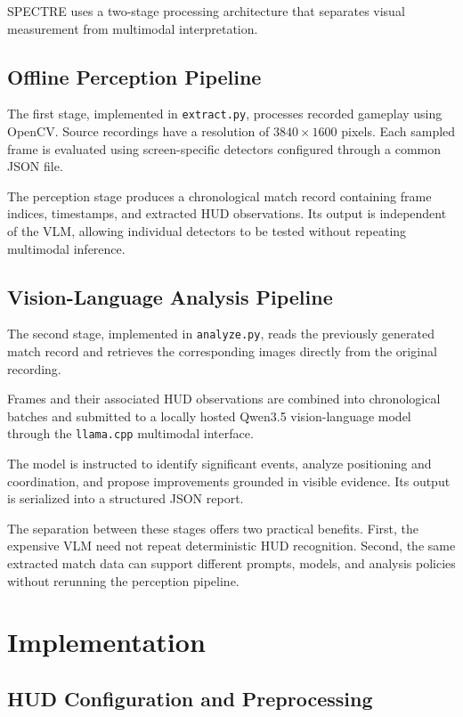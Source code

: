 \documentclass[10pt,letterpaper]{article}
\begin{document}
SPECTRE uses a two-stage processing architecture that separates
visual measurement from multimodal interpretation.

\subsection{Offline Perception Pipeline}

The first stage, implemented in \texttt{extract.py}, processes
recorded gameplay using OpenCV. Source recordings have a resolution
of $3840 \times 1600$ pixels. Each sampled frame is evaluated using
screen-specific detectors configured through a common JSON file.

The perception stage produces a chronological match record
containing frame indices, timestamps, and extracted HUD observations.
Its output is independent of the VLM, allowing individual detectors
to be tested without repeating multimodal inference.

\subsection{Vision-Language Analysis Pipeline}

The second stage, implemented in \texttt{analyze.py}, reads the
previously generated match record and retrieves the corresponding
images directly from the original recording.

Frames and their associated HUD observations are combined into
chronological batches and submitted to a locally hosted Qwen3.5
vision-language model through the \texttt{llama.cpp} multimodal
interface.

The model is instructed to identify significant events, analyze
positioning and coordination, and propose improvements grounded
in visible evidence. Its output is serialized into a structured
JSON report.

The separation between these stages offers two practical benefits.
First, the expensive VLM need not repeat deterministic HUD
recognition. Second, the same extracted match data can support
different prompts, models, and analysis policies without
rerunning the perception pipeline.

\section{Implementation}

\subsection{HUD Configuration and Preprocessing}
\end{document}
